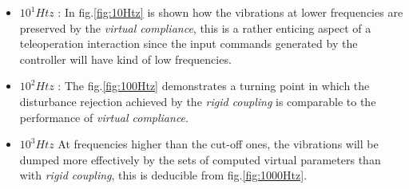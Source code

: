 \begin{itemize}
\item $10^{1} Htz$ : In fig.\ref{fig:10Htz} is shown how the vibrations at lower frequencies are preserved by the
\textsl{virtual compliance}, this is a rather enticing aspect of a teleoperation interaction
since the input commands generated by the controller will have kind of low frequencies.
\item $10^{2} Htz$ : The fig.\ref{fig:100Htz} demonstrates a turning point in which the
disturbance rejection achieved by the \textsl{rigid coupling} is comparable to
the performance of \textsl{virtual compliance}.
\item $10^{3} Htz$ At frequencies higher than the cut-off ones, the
vibrations will be dumped more effectively by the sets of computed virtual
parameters than with \textsl{rigid coupling}, this is deducible from fig.\ref{fig:1000Htz}.
\end{itemize}


